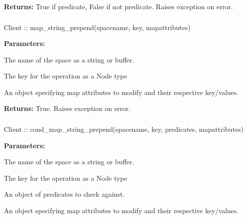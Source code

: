 \noindent\textbf{Returns:}
True if predicate, False if not predicate.  Raises exception on error.

\subsubsection{}
\label{api:nodejs:map_string_prepend}
\begin{javascriptcode}
Client :: map_string_prepend(spacename, key, mapattributes)
\end{javascriptcode}


\noindent\textbf{Parameters:}
\begin{description}[labelindent=\widthof{{\code{mapattributes}}},leftmargin=*,noitemsep,nolistsep,align=right]
\item[\code{spacename}] The name of the space as a string or buffer.
\item[\code{key}] The key for the operation as a Node type
\item[\code{mapattributes}] An object specifying map attributes to modify and their respective key/values.
\end{description}

\noindent\textbf{Returns:}
True.  Raises exception on error.

\subsubsection{}
\label{api:nodejs:cond_map_string_prepend}
\begin{javascriptcode}
Client :: cond_map_string_prepend(spacename, key, predicates, mapattributes)
\end{javascriptcode}


\noindent\textbf{Parameters:}
\begin{description}[labelindent=\widthof{{\code{mapattributes}}},leftmargin=*,noitemsep,nolistsep,align=right]
\item[\code{spacename}] The name of the space as a string or buffer.
\item[\code{key}] The key for the operation as a Node type
\item[\code{predicates}] An object of predicates to check against.
\item[\code{mapattributes}] An object specifying map attributes to modify and their respective key/values.
\end{description}

